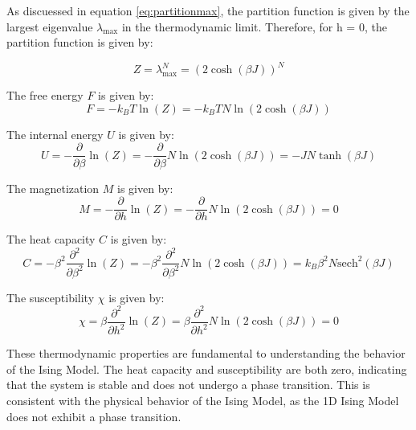 As discuessed in equation \ref{eq:partitionmax}, the partition function is given
by the largest eigenvalue \( \lambda_{\text{max}} \) in the thermodynamic limit.
Therefore, for h = 0, the partition function is given by:

\begin{equation}
Z = \lambda_{\text{max}}^N = (2 \cosh(\beta J))^N
\label{eq:partitionh0}
\end{equation}

The free energy \( F \) is given by:
\begin{equation}
F = -k_B T \ln(Z) = -k_B T N \ln(2 \cosh(\beta J))
\end{equation}

The internal energy \( U \) is given by:
\begin{equation}
U = - \frac{\partial}{\partial \beta} \ln(Z) = - \frac{\partial}{\partial \beta} N \ln(2 \cosh(\beta J)) = -JN \tanh(\beta J)
\end{equation}

The magnetization \( M \) is given by:
\begin{equation}
M = - \frac{\partial}{\partial h} \ln(Z) = - \frac{\partial}{\partial h} N \ln(2 \cosh(\beta J)) = 0
\end{equation}

The heat capacity \( C \) is given by:
\begin{equation}
C = - \beta^2 \frac{\partial^2}{\partial \beta^2} \ln(Z) = - \beta^2 \frac{\partial^2}{\partial \beta^2} N \ln(2 \cosh(\beta J)) = k_B \beta^2 N \text{sech}^2(\beta J)
\end{equation}

The susceptibility \( \chi \) is given by:
\begin{equation}
\chi = \beta \frac{\partial^2}{\partial h^2} \ln(Z) = \beta \frac{\partial^2}{\partial h^2} N \ln(2 \cosh(\beta J)) = 0
\end{equation}

These thermodynamic properties are fundamental to understanding the behavior of
the Ising Model. The heat capacity and susceptibility are both zero, indicating
that the system is stable and does not undergo a phase transition. This is
consistent with the physical behavior of the Ising Model, as the 1D Ising Model
does not exhibit a phase transition.
